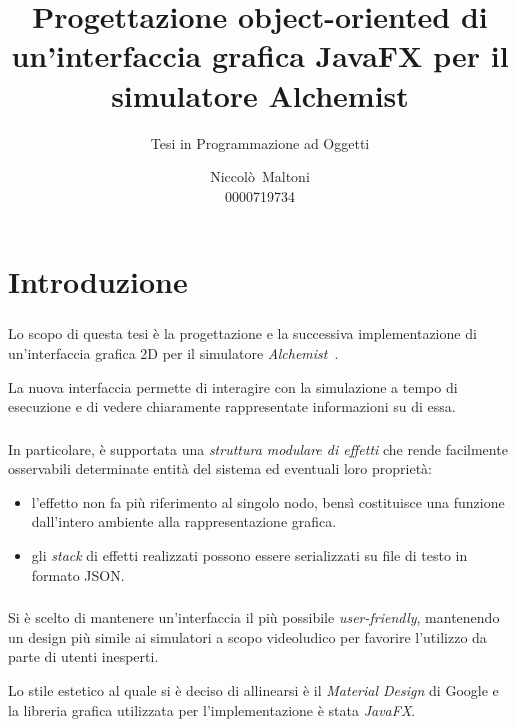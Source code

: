 \documentclass[%
]{beamer}
\title[Nuova GUI Alchemist in JavaFX]{%
    Progettazione object-oriented di un'interfaccia grafica %
    JavaFX per il simulatore Alchemist
}
\subtitle{Tesi in Programmazione ad Oggetti}
\author[Niccolò~Maltoni]{Niccolò~Maltoni\\0000719734}
\date{%
}
\institute[%
]{%
    Alma Mater Studiorum - Università di Bologna\\%
    Campus di Cesena%
}
\newcommand{\engEmph}[1] {\emph{\foreignlanguage{english}#1}}
\begin{document}
    \begin{frame}
        \titlepage
    \end{frame}

    \section{Introduzione}\label{sec:intro}
    \begin{frame}
        \frametitle{\insertsection}

        Lo scopo di questa tesi è la progettazione e la successiva implementazione di un'interfaccia grafica 2D per il simulatore \emph{Alchemist}~\cite{alchemist2013}.

        \medskip %
        \pause

        La nuova interfaccia permette di interagire con la simulazione a tempo di esecuzione e di vedere chiaramente rappresentate informazioni su di essa.
    \end{frame}

    \begin{frame}
        \frametitle{\insertsection}

        In particolare, è supportata una \emph{struttura modulare di effetti} che rende facilmente osservabili determinate entità del sistema ed eventuali loro proprietà:

        \begin{itemize}[<+(1)->]
            \item
                l'effetto non fa più riferimento al singolo nodo, bensì costituisce una funzione dall'intero ambiente alla rappresentazione grafica.
            \item
                gli \engEmph{stack} di effetti realizzati possono essere serializzati su file di testo in formato JSON.
        \end{itemize}
    \end{frame}

    \begin{frame}
        \frametitle{\insertsection}

        Si è scelto di mantenere un'interfaccia il più possibile \engEmph{user-friendly}, mantenendo un design più simile ai simulatori a scopo videoludico per favorire l'utilizzo da parte di utenti inesperti.

        \medskip
        \pause

        Lo stile estetico al quale si è deciso di allinearsi è il \emph{Material Design} di Google e la libreria grafica utilizzata per l'implementazione è stata \emph{JavaFX}.
    \end{frame}
\end{document}

